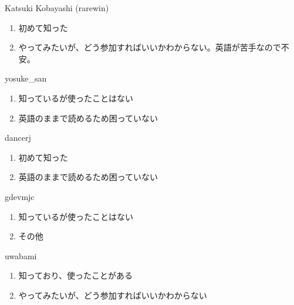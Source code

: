 \begin{prework}{ Katsuki Kobayashi (rarewin) }
  \begin{enumerate}
  \item 初めて知った
  \item やってみたいが、どう参加すればいいかわからない。英語が苦手なので不安。
  \end{enumerate}
\end{prework}

\begin{prework}{ yosuke\_san }
  \begin{enumerate}
  \item 知っているが使ったことはない
  \item 英語のままで読めるため困っていない
  \end{enumerate}
\end{prework}

\begin{prework}{ dancerj }
  \begin{enumerate}
  \item 初めて知った
  \item 英語のままで読めるため困っていない
  \end{enumerate}
\end{prework}

\begin{prework}{ gdevmjc }
  \begin{enumerate}
  \item 知っているが使ったことはない
  \item その他
  \end{enumerate}
\end{prework}

\begin{prework}{ uwabami }
  \begin{enumerate}
  \item 知っており、使ったことがある
  \item やってみたいが、どう参加すればいいかわからない
  \end{enumerate}
\end{prework}
